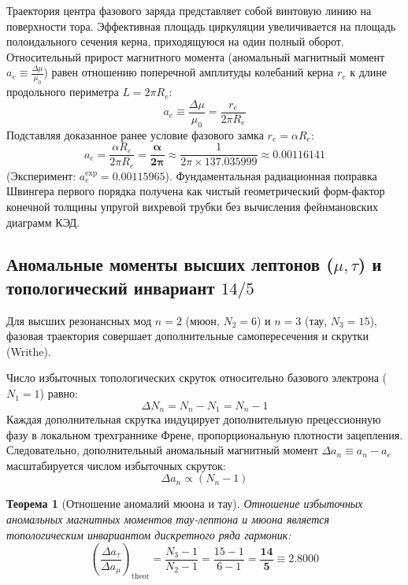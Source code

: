 \documentclass[12pt,a4paper]{article}
\newtheorem{theorem}{Теорема}
\begin{document}
Траектория центра фазового заряда представляет собой винтовую линию на поверхности тора. Эффективная площадь циркуляции увеличивается на площадь полоидального сечения керна, приходящуюся на один полный оборот. 
Относительный прирост магнитного момента (аномальный магнитный момент $a_e \equiv \frac{\Delta \mu}{\mu_0}$) равен отношению поперечной амплитуды колебаний керна $r_e$ к длине продольного периметра $L = 2\pi R_e$:
\begin{equation}
	a_e \equiv \frac{\Delta \mu}{\mu_0} = \frac{r_e}{2\pi R_e}
\end{equation}
Подставляя доказанное ранее условие фазового замка $r_e = \alpha R_e$:
\begin{equation}
	a_e = \frac{\alpha R_e}{2\pi R_e} = \mathbf{\frac{\alpha}{2\pi}} \approx \frac{1}{2\pi \times 137.035999} \approx \mathbf{0.00116141}
\end{equation}
(Эксперимент: $a_e^{\text{exp}} = 0.00115965$). Фундаментальная радиационная поправка Швингера первого порядка получена как чистый геометрический форм-фактор конечной толщины упругой вихревой трубки без вычисления фейнмановских диаграмм КЭД.

\subsection{Аномальные моменты высших лептонов ($\mu, \tau$) и топологический инвариант $14/5$}
Для высших резонансных мод $n=2$ (мюон, $N_2=6$) и $n=3$ (тау, $N_3=15$), фазовая траектория совершает дополнительные самопересечения и скрутки (Writhe). 

Число избыточных топологических скруток относительно базового электрона ($N_1=1$) равно:
\begin{equation}
	\Delta N_n = N_n - N_1 = N_n - 1
\end{equation}
Каждая дополнительная скрутка индуцирует дополнительную прецессионную фазу в локальном трехграннике Френе, пропорциональную плотности зацепления. Следовательно, дополнительный аномальный магнитный момент $\Delta a_n \equiv a_n - a_e$ масштабируется числом избыточных скруток:
\begin{equation}
	\Delta a_n \propto (N_n - 1)
\end{equation}

\begin{theorem}[Отношение аномалий мюона и тау]
	Отношение избыточных аномальных магнитных моментов тау-лептона и мюона является топологическим инвариантом дискретного ряда гармоник:
	\begin{equation}
		\left( \frac{\Delta a_\tau}{\Delta a_\mu} \right)_{\mathrm{theor}} = \frac{N_3 - 1}{N_2 - 1} = \frac{15 - 1}{6 - 1} = \mathbf{\frac{14}{5} \equiv 2.8000}
	\end{equation}
\end{theorem}
\end{document}

